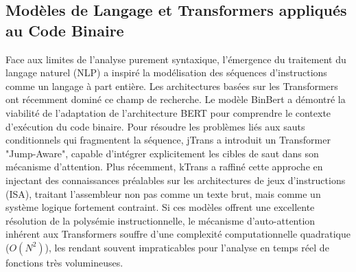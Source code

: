 \subsection{Modèles de Langage et Transformers appliqués au Code Binaire}
Face aux limites de l'analyse purement syntaxique, l'émergence du traitement du langage naturel (NLP) a inspiré la modélisation des séquences d'instructions comme un langage à part entière.
Les architectures basées sur les Transformers ont récemment dominé ce champ de recherche.
Le modèle BinBert \cite{artuso2024binbert} a démontré la viabilité de l'adaptation de l'architecture BERT pour comprendre le contexte d'exécution du code binaire.
Pour résoudre les problèmes liés aux sauts conditionnels qui fragmentent la séquence, jTrans \cite{wang2022jtrans} a introduit un Transformer "Jump-Aware", capable d'intégrer explicitement les cibles de saut dans son mécanisme d'attention.
Plus récemment, kTrans \cite{zhu2023ktrans} a raffiné cette approche en injectant des connaissances préalables sur les architectures de jeux d'instructions (ISA), traitant l'assembleur non pas comme un texte brut, mais comme un système logique fortement contraint.
Si ces modèles offrent une excellente résolution de la polysémie instructionnelle, le mécanisme d'auto-attention inhérent aux Transformers souffre d'une complexité computationnelle quadratique ($O(N^2)$), les rendant souvent impraticables pour l'analyse en temps réel de fonctions très volumineuses.

